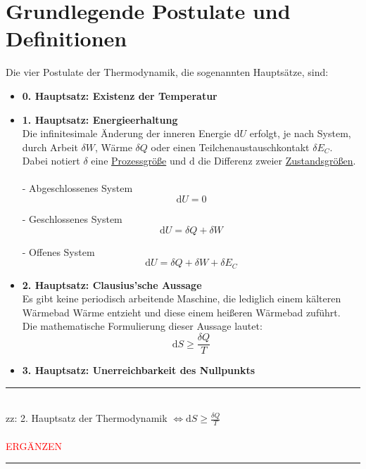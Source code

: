 \documentclass{article}
\newcommand{\diff}{\mathrm{d}}
\begin{document}
\section{Grundlegende Postulate und Definitionen}
Die vier Postulate der Thermodynamik, die sogenannten Hauptsätze, sind:
	\begin{itemize}
		\item \textbf{0. Hauptsatz: Existenz der Temperatur}
		
		
		\item \textbf{1. Hauptsatz: Energieerhaltung}\\
		Die infinitesimale Änderung der inneren Energie $\diff U$ erfolgt, je nach System, durch Arbeit $\delta W$, Wärme $\delta Q$ oder einen Teilchenaustauschkontakt $\delta E_C$.\\
		\textcolor{gruen}{Dabei notiert $\delta$ eine \underline{Prozessgröße} und $\diff$ die Differenz zweier \underline{Zustandsgrößen}.}\\
	\\
		- Abgeschlossenes System
			\begin{equation}
				\diff U = 0
			\end{equation}
		
		- Geschlossenes System
			\begin{equation}
				\diff U = \delta Q + \delta W
			\end{equation}
		
		- Offenes System
			\begin{equation}
				\diff U = \delta Q + \delta W + \delta E_C
			\end{equation}
		
		
		\item \textbf{2. Hauptsatz: Clausius'sche Aussage}\\
		Es gibt keine periodisch arbeitende Maschine, die lediglich einem kälteren Wärmebad Wärme entzieht und diese einem heißeren Wärmebad zuführt.\\
		Die mathematische Formulierung dieser Aussage lautet:
			\begin{equation}
				\diff S \geq \frac{\delta Q}{T}
			\end{equation}


		\item \textbf{3. Hauptsatz: Unerreichbarkeit des Nullpunkts}
	\end{itemize}


\newpage


{\color{violet}
\hrule
	\\
	zz: 2. Hauptsatz der Thermodynamik $\Leftrightarrow \diff S \geq \frac{\delta Q}{T}$\\
	\\
	\textcolor{red}{ERGÄNZEN}


\hrule
}
\end{document}
